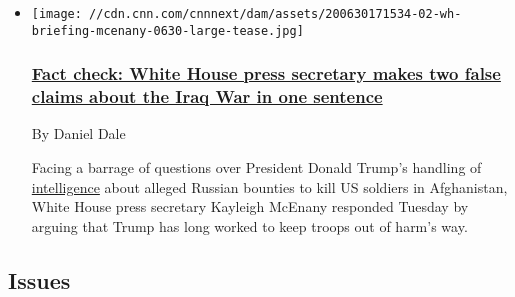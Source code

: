\begin{itemize}
\item
  \href{/2020/07/01/politics/fact-check-mcenany-trump-iraq/index.html}{}

  \texttt{[image: //cdn.cnn.com/cnnnext/dam/assets/200630171534-02-wh-briefing-mcenany-0630-large-tease.jpg]}

  \hypertarget{fact-check-white-house-press-secretary-makes-two-false-claims-about-the-iraq-war-in-one-sentence}{%
  \subsubsection{\texorpdfstring{\href{/2020/07/01/politics/fact-check-mcenany-trump-iraq/index.html}{Fact
  check: White House press secretary makes two false claims about the
  Iraq War in one
  sentence}}{Fact check: White House press secretary makes two false claims about the Iraq War in one sentence}}\label{fact-check-white-house-press-secretary-makes-two-false-claims-about-the-iraq-war-in-one-sentence}}

  By Daniel Dale

  Facing a barrage of questions over President Donald Trump's handling
  of
  \href{https://www.cnn.com/2020/06/30/politics/white-house-russia-afghanistan-bounties-intelligence-2019/index.html}{intelligence}
  about alleged Russian bounties to kill US soldiers in Afghanistan,
  White House press secretary Kayleigh McEnany responded Tuesday by
  arguing that Trump has long worked to keep troops out of harm's way.
\end{itemize}

\hypertarget{issues-}{%
\subsection{Issues~}\label{issues-}}

